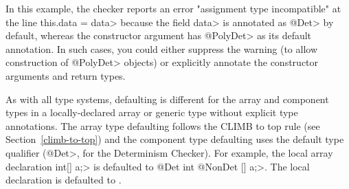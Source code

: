 In this example, the checker reports an error "assignment type incompatible"
at the line \<this.data = data> because the field \<data> is annotated as
\<@Det> by default, whereas the constructor argument has \<@PolyDet>
as its default annotation. In such cases, you could either suppress the warning
(to allow construction of \<@PolyDet> objects) or explicitly annotate the
constructor arguments and return types.

As with all type systems, defaulting is different for the array and
component types in a locally-declared array or generic type without explicit type
annotations.
The array type defaulting follows the CLIMB to top rule (see Section~\ref{climb-to-top}) and
the component type defaulting uses the default type qualifier (\<@Det>, for
the Determinism Checker).
For example, the local array declaration \<int[] a;> is defaulted to \<@Det int @NonDet [] a;>.
The local declaration  is defaulted to
.



